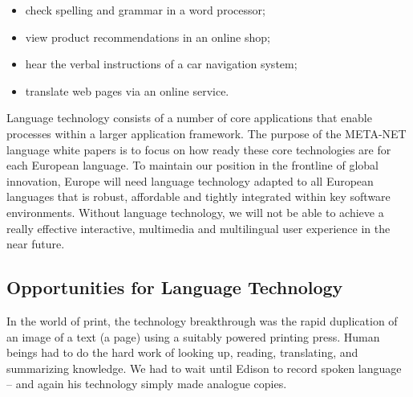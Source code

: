 \begin{multicols}{2}
\begin{itemize}
\item check spelling and grammar in a word processor;

\item view product recommendations in an online shop;

\item hear the verbal instructions of a car navigation system;

\item translate web pages via an online service.
\end{itemize}

Language technology consists of a number of core applications that
enable processes within a larger application framework. The purpose of
the META-NET language white papers is to focus on how ready these core
technologies are for each European language.
To maintain our position in the frontline of global innovation, Europe
will need language technology adapted to all European languages that
is robust, affordable and tightly integrated within key software
environments. Without language technology, we will not be able to
achieve a really effective interactive, multimedia and multilingual
user experience in the near future.

\subsection{Opportunities for Language Technology}
In the world of print, the technology breakthrough was the rapid duplication of
an image of a text (a page) using a suitably powered printing press. Human
beings had to do the hard work of looking up, reading, translating, and
summarizing knowledge. We had to wait until Edison to record spoken language –
and again his technology simply made analogue copies.


\end{multicols}
